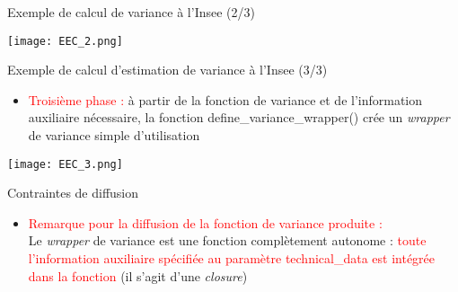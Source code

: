 \documentclass[xcolor=dvipsnames]{beamer}
\begin{document}
\begin{frame}{Exemple de calcul de variance à l'Insee (2/3)}
    
\begin{center}
    \texttt{[image: EEC\_2.png]}
\end{center}

\end{frame}

\begin{frame}{Exemple de calcul d'estimation de variance à l'Insee (3/3)}

\begin{itemize}
    \item \textcolor{red}{Troisième phase :} à partir de la fonction de variance et de l'information auxiliaire nécessaire, la fonction define\_variance\_wrapper() crée un \textit{wrapper} de variance simple d’utilisation
\end{itemize}

\begin{center}
    \texttt{[image: EEC\_3.png]}
\end{center}

\end{frame}

\begin{frame}{Contraintes de diffusion}

\begin{itemize}
    \item \textcolor{red}{Remarque pour la diffusion de la fonction de variance produite :} \\ \vspace{0.2 cm} Le \textit{wrapper} de variance est une fonction complètement autonome : \textcolor{red}{toute l'information auxiliaire spécifiée au paramètre technical\_data est intégrée dans la fonction} (il s'agit d'une \textit{closure})
\end{itemize}

\end{frame}
\end{document}
